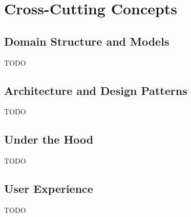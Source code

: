 \section{Cross-Cutting Concepts}
\subsection{Domain Structure and Models}
TODO
\subsection{Architecture and Design Patterns}
TODO
\subsection{Under the Hood}
TODO
\subsection{User Experience}
TODO